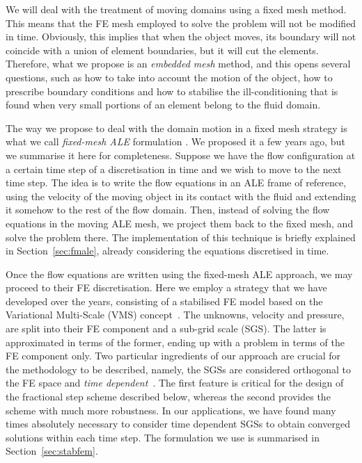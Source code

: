 \documentclass[11pt,a4paper,oneside,reqno]{amsart}
\begin{document}
We will deal with the treatment of moving domains using a fixed mesh method. This means that the FE mesh employed to solve the problem will not be modified in time. Obviously, this implies that when the object moves, its boundary will not coincide with a union of element boundaries, but it will cut the elements. Therefore, what we propose is an {\em embedded mesh} method, and this opens several questions, such as how to take into account the motion of the object, how to prescribe boundary conditions and how to stabilise the ill-conditioning that is found when very small portions of an element belong to the fluid domain. 

The way we propose to deal with the domain motion in a fixed mesh strategy is what we call {\em fixed-mesh ALE} formulation  \cite{houzeauxc4,codina-et-al-2009-2}. We proposed it a few years ago, but we summarise it here for completeness. Suppose we have the flow configuration at a certain time step of a discretisation in time and we wish to move to the next time step. The idea is to write the flow equations in an ALE frame of reference, using the velocity of the moving object in its contact with the fluid and extending it somehow to the rest of the flow domain. Then, instead of solving the flow equations in the moving ALE mesh, we project them back to the fixed mesh, and solve the problem there. The implementation of this technique is briefly explained in Section~\ref{sec:fmale}, already considering the equations discretised in time.

Once the flow equations are written using the fixed-mesh ALE approach, we may proceed to their FE discretisation. Here we employ a strategy that we have developed over the years, consisting of a stabilised FE model based on the Variational Multi-Scale (VMS) concept~\cite{hughes1}. The unknowns, velocity and pressure, are split into their FE component and a sub-grid scale (SGS). The latter is approximated in terms of the former, ending up with a problem in terms of the FE component only. Two particular ingredients of our approach are crucial for the methodology to be described, namely, the SGSs are considered orthogonal to the FE space and {\em time dependent}~\cite{codina9,codinap1}. The first feature is critical for the design of the fractional step scheme described below, whereas the second provides the scheme with much more robustness. In our applications, we have found many times absolutely necessary to consider time dependent SGSs to obtain converged solutions within each time step. The formulation we use is summarised in Section~\ref{sec:stabfem}.
\end{document}

